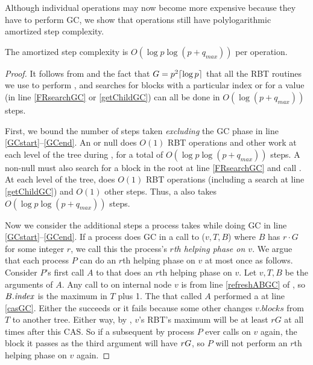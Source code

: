 Although individual operations may now become more expensive because they have to perform GC,
we show that operations still have polylogarithmic amortized step complexity.

\begin{proposition}
The amortized step complexity is $O(\log p \log(p+q_{max}))$ per operation.
\end{proposition}
\begin{proof}
It follows from  and the fact that $G=p^2\lceil \log p \rceil$
that all the RBT routines we use to perform ,  and searches for
blocks with a particular index or for a  value (in line \ref{FRsearchGC} or \ref{getChildGC}) can all be done in $O(\log(p+q_{max}))$ steps.

First, we bound the number of steps taken \emph{excluding} the GC phase in line \ref{GCstart}--\ref{GCend}.
An  or null  does $O(1)$ RBT operations and other work at each level of the tree during ,
for a total of $O(\log p \log(p+q_{max}))$ steps.
A non-null  must also search for a block in the root at line \ref{FRsearchGC}
and call .  At each level of the tree,  does $O(1)$ RBT operations (including a search at line \ref{getChildGC}) and $O(1)$ other steps.
Thus, a  also takes $O(\log p \log(p+q_{max}))$ steps.

Now we consider the additional steps a process takes while doing GC in line \ref{GCstart}--\ref{GCend}.
If a process does GC in a call to ($v,T,B$) where $B$ has  $r\cdot G$ for some integer $r$, we call this the process's \emph{$r$th helping phase on $v$}.
We argue that each process $P$ can do an $r$th helping phase on $v$ at most once as follows.
Consider $P$'s first call $A$ to  that does an $r$th helping phase on $v$.
Let $v,T,B$ be the arguments of $A$.
Any call to  on internal node $v$ is from line \ref{refreshABGC} of , so $B.\mbox{\textit{index}}$
is the maximum  in $T$ plus 1.
The  that called $A$ performed a  at line \ref{casGC}.  Either the  succeeds
or it fails because 
some other  changes $v.blocks$ from $T$ to another tree.
Either way, by , $v$'s RBT's maximum  will be at least $rG$ at all times
after this CAS.
So if a subsequent  by process $P$ 
ever calls  on $v$ again, the block it passes as the third argument
will have $\index>rG$, so $P$ will not perform an $r$th helping phase on $v$ again.


\end{proof}
